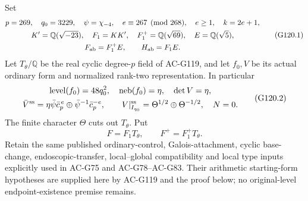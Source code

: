 \begin{theorem}
\label{thm:G120}
Set
\[
 \begin{gathered}
 p=269,\quad q_0=3229,\quad \psi=\chi_{-4},\quad
 e\equiv267\pmod{268},\quad e\ge1,\quad k=2e+1,\\
 K'=\mathbb Q(\sqrt{-23}),\quad F_1=KK',\quad
 F_1^+=\mathbb Q(\sqrt{69}),\quad E=\mathbb Q(\sqrt5),\\
 F_{\rm ab}=F_1^+E,\qquad H_{\rm ab}=F_1E.
 \end{gathered}                                                     \tag{G120.1}
\]
Let $T_\theta/\mathbb Q$ be the real cyclic degree-$p$ field of
AC-G119, and let $f_0,V$ be its actual ordinary form and normalized
rank-two representation.  In particular
\[
 \begin{gathered}
 \operatorname{level}(f_0)=48q_0^2,\quad
 \operatorname{neb}(f_0)=\eta,\quad \det V=\eta,\\
 \bar V^{\rm ss}=\eta\bar\psi\bar c_p^{\,e}
                         \oplus\bar\psi^{-1}\bar c_p^{-e},\qquad
 V|_{I_{q_0}}^{\rm ss}=\Theta^{1/2}\oplus\Theta^{-1/2},\quad N=0.
 \end{gathered}                                                     \tag{G120.2}
\]
The finite character $\Theta$ cuts out $T_\theta$.
Put
\[
                   F=F_1T_\theta,\qquad F^+=F_1^+T_\theta.
                                                                    \tag{G120.3}
\]
Retain the same published ordinary-control, Galois-attachment, cyclic
base-change, endoscopic-transfer, local--global compatibility and local
type inputs explicitly used in AC-G75 and AC-G78--AC-G83.  Their
arithmetic starting-form hypotheses are supplied here by AC-G119 and
the proof below; no original-level endpoint-existence premise remains.


\end{theorem}
